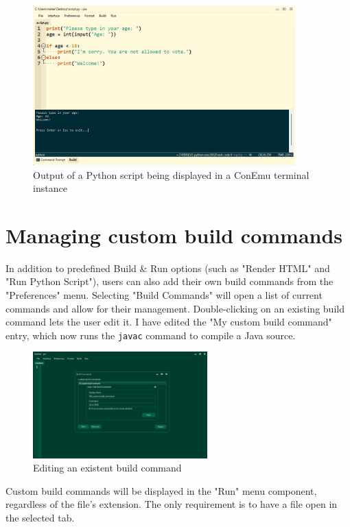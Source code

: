 \begin{figure}[H]
\centering
\includegraphics[width=0.9\textwidth]{images/python-output.jpg}
\caption{Output of a Python script being displayed in a ConEmu terminal instance}
\label{fig:fig2,1.}
\end{figure}

\section{Managing custom build commands}

In addition to predefined Build \& Run options (such as "Render HTML" and "Run Python Script"), users can also add their own build commands from the "Preferences" menu. Selecting "Build Commands" will open a list of current commands and allow for their management. Double-clicking on an existing build command lets the user edit it. I have edited the "My custom build command" entry, which now runs the \texttt{javac} command to compile a Java source.

\begin{figure}[H]
\centering
\includegraphics[width=0.6\textwidth]{images/editing-build-command.jpg}
\caption{Editing an existent build command}
\label{fig:fig2,1.}
\end{figure}

Custom build commands will be displayed in the "Run" menu component, regardless of the file's extension. The only requirement is to have a file open in the selected tab.

